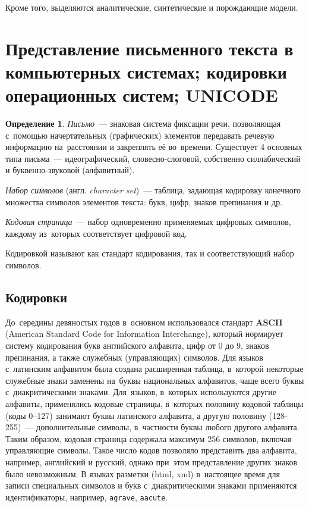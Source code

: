 \documentclass[12pt]{article}
\theoremstyle{definition}
\newtheorem*{defn}{Определение}
\theoremstyle{remark}
\numberwithin{equation}{section}
\begin{document}
Кроме того, выделяются аналитические, синтетические и порождающие модели.

\section{Представление письменного текста в компьютерных системах;
кодировки операционных систем; UNICODE}
\begin{defn}
\textsl{Письмо}~--- знаковая система фиксации речи, позволяющая с~помощью
начертательных (графических) элементов передавать речевую информацию
на~расстоянии и закреплять её во~времени. Существует 4 основных типа
письма~--- идеографический, словесно-слоговой, собственно силлабический
и буквенно-звуковой (алфавитный).

{\sl Набор символов} (англ. {\sl character set})~--- таблица, задающая
кодировку конечного множества символов элементов текста: букв, цифр,
знаков препинания и др.

{\sl Кодовая страница}~--- набор одновременно применяемых цифровых символов,
каждому из~которых соответствует цифровой код.
\end{defn}

Кодировкой называют как стандарт кодирования, так и соответствующий набор
символов.

\subsection{Кодировки}
До~середины девяностых годов в~основном использовался стандарт \textbf{ASCII}
(American Standard Code for Information Interchange), который нормирует систему
кодирования букв английского алфавита, цифр от 0 до 9, знаков препинания, а также
служебных (управляющих) символов. Для языков с~латинским алфавитом была создана
расширенная таблица, в~которой некоторые служебные знаки заменены на~буквы
национальных алфавитов, чаще всего буквы с~диакритическими знаками. Для~языков,
в~которых используются другие алфавиты, применялись кодовые страницы, в~которых
половину кодовой таблицы (коды 0--127) занимают буквы латинского алфавита,
а другую половину (128-255)~--- дополнительные символы, в~частности буквы любого
другого алфавита. Таким образом, кодовая страница содержала максимум 256 символов,
включая управляющие символы. Такое число кодов позволяло представить два алфавита,
например, английский и русский, однако при~этом представление других знаков
было невозможным. В языках разметки (html, xml) в~настоящее время для записи
специальных символов и букв с~диакритическими знаками применяются идентификаторы,
например, \texttt{agrave}, \texttt{aacute}.
\end{document}
